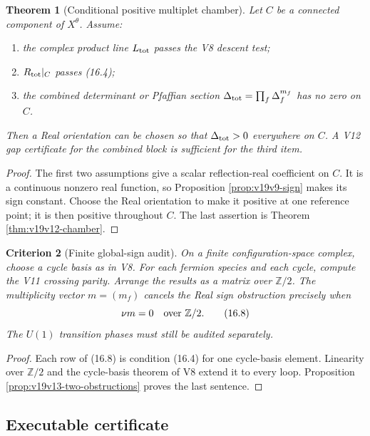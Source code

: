 \documentclass[11pt]{article}
\newtheorem{theorem}{Theorem}[section]
\newtheorem{criterion}[theorem]{Criterion}
\theoremstyle{remark}
\begin{document}
\begin{theorem}[Conditional positive multiplet chamber]
\label{thm:v19v13-positive-chamber}
Let \(C\) be a connected component of \(X^\theta\).  Assume:
\begin{enumerate}
 \item the complex product line \(L_{\rm tot}\) passes the V8 descent test;
 \item \(R_{\rm tot}|_C\) passes (16.4);
 \item the combined determinant or Pfaffian section
       \(\Delta_{\rm tot}=\prod_f\Delta_f^{m_f}\) has no zero on \(C\).
\end{enumerate}
Then a Real orientation can be chosen so that
\(\Delta_{\rm tot}>0\) everywhere on \(C\).  A V12 gap certificate for the
combined block is sufficient for the third item.
\end{theorem}

\begin{proof}
The first two assumptions give a scalar reflection-real coefficient on
\(C\).  It is a continuous nonzero real function, so Proposition
\ref{prop:v19v9-sign} makes its sign constant.  Choose the Real orientation
to make it positive at one reference point; it is then positive throughout
\(C\).  The last assertion is Theorem \ref{thm:v19v12-chamber}.
\end{proof}

\begin{criterion}[Finite global-sign audit]
\label{crit:v19v13-audit}
On a finite configuration-space complex, choose a cycle basis as in V8.
For each fermion species and each cycle, compute the V11 crossing parity.
Arrange the results as a matrix over \(\mathbb Z/2\).  The multiplicity
vector \(m=(m_f)\) cancels the Real sign obstruction precisely when
\[
 \nu m=0\quad\hbox{over }\mathbb Z/2.                          \tag{16.8}
\]
The \(U(1)\) transition phases must still be audited separately.
\end{criterion}

\begin{proof}
Each row of (16.8) is condition (16.4) for one cycle-basis element.
Linearity over \(\mathbb Z/2\) and the cycle-basis theorem of V8 extend it
to every loop.  Proposition \ref{prop:v19v13-two-obstructions} proves the
last sentence.
\end{proof}

\subsection{Executable certificate}
\end{document}
